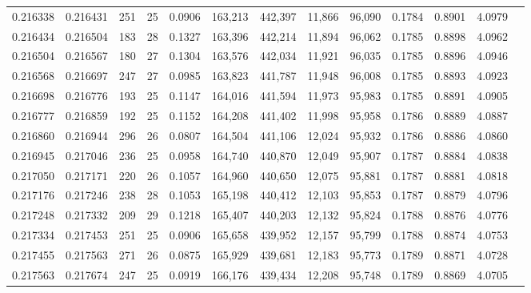 \begin{tabular}{rrrrrrrrrrrrr}
0.216338 & 0.216431 &   251 &  25 &                                     0.0906 & 163,213 & 442,397 &  11,866 &  96,090 & 0.1784 & 0.8901 & 4.0979 \\
0.216434 & 0.216504 &   183 &  28 &                                     0.1327 & 163,396 & 442,214 &  11,894 &  96,062 & 0.1785 & 0.8898 & 4.0962 \\
0.216504 & 0.216567 &   180 &  27 &                                     0.1304 & 163,576 & 442,034 &  11,921 &  96,035 & 0.1785 & 0.8896 & 4.0946 \\
0.216568 & 0.216697 &   247 &  27 &                                     0.0985 & 163,823 & 441,787 &  11,948 &  96,008 & 0.1785 & 0.8893 & 4.0923 \\
0.216698 & 0.216776 &   193 &  25 &                                     0.1147 & 164,016 & 441,594 &  11,973 &  95,983 & 0.1785 & 0.8891 & 4.0905 \\
0.216777 & 0.216859 &   192 &  25 &                                     0.1152 & 164,208 & 441,402 &  11,998 &  95,958 & 0.1786 & 0.8889 & 4.0887 \\
0.216860 & 0.216944 &   296 &  26 &                                     0.0807 & 164,504 & 441,106 &  12,024 &  95,932 & 0.1786 & 0.8886 & 4.0860 \\
0.216945 & 0.217046 &   236 &  25 &                                     0.0958 & 164,740 & 440,870 &  12,049 &  95,907 & 0.1787 & 0.8884 & 4.0838 \\
0.217050 & 0.217171 &   220 &  26 &                                     0.1057 & 164,960 & 440,650 &  12,075 &  95,881 & 0.1787 & 0.8881 & 4.0818 \\
0.217176 & 0.217246 &   238 &  28 &                                     0.1053 & 165,198 & 440,412 &  12,103 &  95,853 & 0.1787 & 0.8879 & 4.0796 \\
0.217248 & 0.217332 &   209 &  29 &                                     0.1218 & 165,407 & 440,203 &  12,132 &  95,824 & 0.1788 & 0.8876 & 4.0776 \\
0.217334 & 0.217453 &   251 &  25 &                                     0.0906 & 165,658 & 439,952 &  12,157 &  95,799 & 0.1788 & 0.8874 & 4.0753 \\
0.217455 & 0.217563 &   271 &  26 &                                     0.0875 & 165,929 & 439,681 &  12,183 &  95,773 & 0.1789 & 0.8871 & 4.0728 \\
0.217563 & 0.217674 &   247 &  25 &                                     0.0919 & 166,176 & 439,434 &  12,208 &  95,748 & 0.1789 & 0.8869 & 4.0705 \\

\end{tabular}
